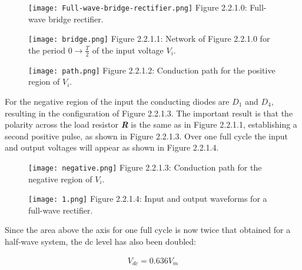 \begin{multicols}{2}
\begin{figure}[H]
\texttt{[image: Full-wave-bridge-rectifier.png]}
\centering \linebreak \linebreak Figure 2.2.1.0: Full-wave bridge rectifier.
\end{figure}

\begin{figure}[H]
\texttt{[image: bridge.png]}
\centering \linebreak \linebreak Figure 2.2.1.1: Network of Figure 2.2.1.0 for the period $0 \rightarrow \frac{T}{2}$ of the input voltage $V_{i}$.
\end{figure}
\end{multicols}

\begin{figure}[H]
\texttt{[image: path.png]}
\centering \linebreak \linebreak Figure 2.2.1.2: Conduction path for the positive region of $V_{i}$.
\end{figure}

For the negative region of the input the conducting diodes are $D_{1}$ and $D_{4}$, resulting
in the configuration of Figure 2.2.1.3. The important result is that the polarity across
the load resistor {\bfseries\itshape R} is the same as in Figure 2.2.1.1, establishing a second positive pulse,
as shown in Figure 2.2.1.3. Over one full cycle the input and output voltages will appear
as shown in Figure 2.2.1.4.

\begin{figure}[H]
\texttt{[image: negative.png]}
\centering \linebreak \linebreak Figure 2.2.1.3: Conduction path for the negative region of $V_{i}$.
\end{figure} \hfill

\begin{multicols}{2}
\begin{figure}[H]
\texttt{[image: 1.png]}
\centering \linebreak \linebreak Figure 2.2.1.4: Input and output waveforms for a full-wave rectifier.
\end{figure}

Since the area above the axis for one full cycle is now twice that obtained for a
half-wave system, the dc level has also been doubled:

\begin{ceqn}
\begin{align}
V_{dc} = 0.636V_{m}
\end{align}
\end{ceqn} 
\end{multicols}

